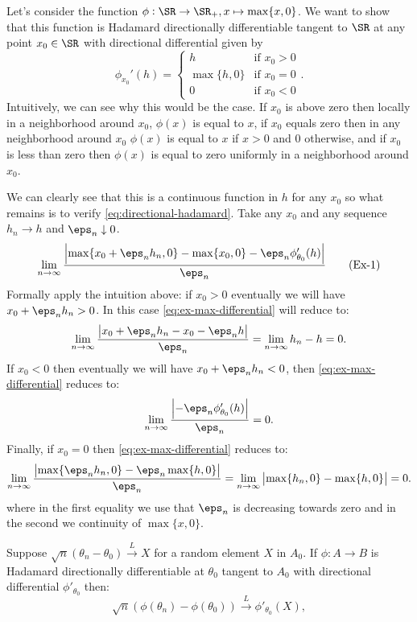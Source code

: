 \begin{example}
	\label{ex:max-directional-differential}
	Let's consider the function \(\phi:\SR\to\SR_+, x\mapsto \max\{x,0\}\). We want to show that this function is Hadamard directionally differentiable tangent to \(\SR\) at any point \(x_0\in\SR\) with directional differential given by 
	\[
		\phi_{x_0}'(h) = \begin{cases}
			h & \text{if } x_0 > 0 \\
			\max\{h,0\} &\text{if } x_0=0\\
			0 & \text{if } x_0 < 0
		\end{cases}
	.\] 
	Intuitively, we can see why this would be the case. If \(x_0\) is above zero then locally in a neighborhood around \(x_0\), \(\phi(x)\) is equal to \(x\), if \(x_0\) equals zero then in any neighborhood around \(x_0\) \(\phi(x)\) is equal to \(x\) if \(x > 0\) and \(0\) otherwise, and if \(x_0\) is less than zero then \(\phi(x)\) is equal to zero uniformly in a neighborhood around \(x_0\).

	We can clearly see that this is a continuous function in \(h\) for any \(x_0\) so what remains is to verify \cref{eq:directional-hadamard}. Take any \(x_0\) and any sequence \(h_n\to h\) and \(\eps_n\downarrow 0\).
	\begin{align}
		\label{eq:ex-max-differential}
		\lim_{n\to\infty}\frac{\left|\max\{x_0 + \eps_nh_n, 0\} - \max\{x_0,0\} - \eps_n \phi_{\theta_0}'(h)\right|}{\eps_n}\tag{Ex-1}
	\end{align}
	Formally apply the intuition above: if \(x_0 > 0\) eventually we will have \(x_0 + \eps_nh_n > 0\). In this case \eqref{eq:ex-max-differential} will reduce to:
	\[
		\lim_{n\to\infty}\frac{\left|x_0 + \eps_nh_n - x_0 - \eps_n h\right|}{\eps_n} = \lim_{n\to\infty} h_n - h = 0 
	.\]
	If \(x_0 < 0\) then eventually we will have \(x_0 + \eps_nh_n <0\), then \eqref{eq:ex-max-differential} reduces to: 
	\[
		\lim_{n\to\infty} \frac{\left| -\eps_n \phi_{\theta_0}'(h)\right|}{\eps_n} = 0
	.\]
	Finally, if \(x_0 = 0\) then \eqref{eq:ex-max-differential} reduces to:
	\[
		\lim_{n\to\infty} \frac{\left|\max\{\eps_nh_n,0\} - \eps_n\max\{h,0\}\right|}{\eps_n} = \lim_{n\to\infty}\left|\max\{h_n,0\}-\max\{h,0\}\right| =0
	.\] 
	where in the first equality we use that \(\eps_n\) is decreasing towards zero and in the second we continuity of \(\max\{x,0\}\).
\end{example}
\begin{theorem}
	\label{thm:directional-delta-method}
	Suppose \(\sqrt{n}\left(\theta_n - \theta_0\right)\overset{L}{\to}X\) for a random element \(X\) in \(A_0\). If \(\phi:A\to B\) is Hadamard directionally differentiable at \(\theta_0\) tangent to \(A_0\) with  directional differential \(\phi'_{\theta_0}\) then:
	 \[
		 \sqrt{n}\left(\phi(\theta_n) - \phi(\theta_0)\right)\overset{L}{\to} \phi'_{\theta_0}(X)
	,\] 
\end{theorem}
